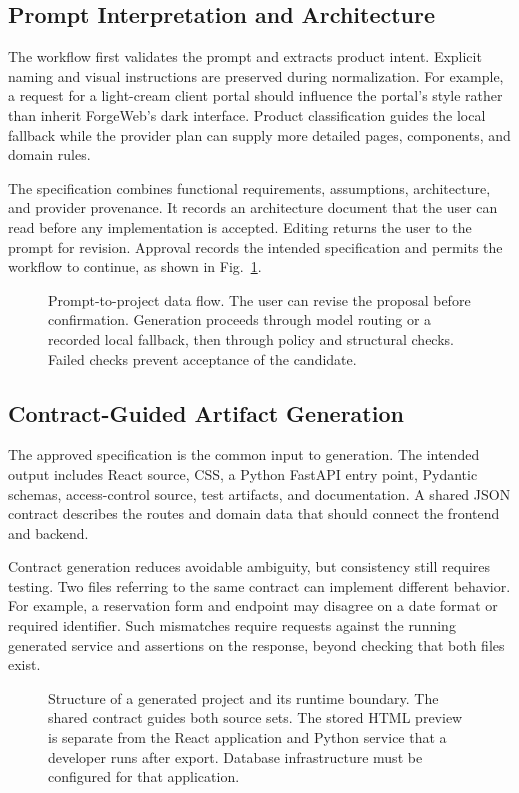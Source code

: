 \documentclass[conference,a4paper]{IEEEtran}
\begin{document}
\subsection{Prompt Interpretation and Architecture}
The workflow first validates the prompt and extracts product intent. Explicit naming and visual instructions are preserved during normalization. For example, a request for a light-cream client portal should influence the portal's style rather than inherit ForgeWeb's dark interface. Product classification guides the local fallback while the provider plan can supply more detailed pages, components, and domain rules.

The specification combines functional requirements, assumptions, architecture, and provider provenance. It records an architecture document that the user can read before any implementation is accepted. Editing returns the user to the prompt for revision. Approval records the intended specification and permits the workflow to continue, as shown in Fig.~\ref{fig:flow}.

\begin{figure}[t]
\centering

\caption{Prompt-to-project data flow. The user can revise the proposal before confirmation. Generation proceeds through model routing or a recorded local fallback, then through policy and structural checks. Failed checks prevent acceptance of the candidate.}
\label{fig:flow}
\end{figure}

\subsection{Contract-Guided Artifact Generation}
The approved specification is the common input to generation. The intended output includes React source, CSS, a Python FastAPI entry point, Pydantic schemas, access-control source, test artifacts, and documentation. A shared JSON contract describes the routes and domain data that should connect the frontend and backend.

Contract generation reduces avoidable ambiguity, but consistency still requires testing. Two files referring to the same contract can implement different behavior. For example, a reservation form and endpoint may disagree on a date format or required identifier. Such mismatches require requests against the running generated service and assertions on the response, beyond checking that both files exist.

\begin{figure}[t]
\centering

\caption{Structure of a generated project and its runtime boundary. The shared contract guides both source sets. The stored HTML preview is separate from the React application and Python service that a developer runs after export. Database infrastructure must be configured for that application.}
\label{fig:structure}
\end{figure}
\end{document}
